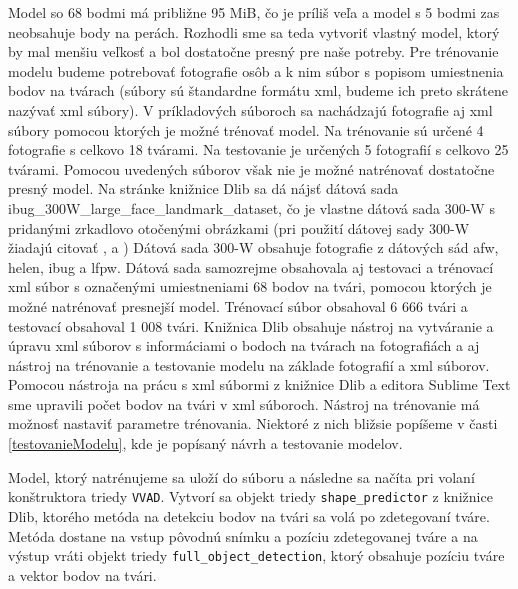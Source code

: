 Model so 68 bodmi má približne 95 MiB, čo je príliš veľa a model s 5 bodmi zas neobsahuje body na perách.
Rozhodli sme sa teda vytvoriť vlastný model, ktorý by mal menšiu veľkosť a bol dostatočne presný pre naše potreby.
Pre trénovanie modelu budeme potrebovať fotografie osôb a k nim súbor s popisom umiestnenia bodov na tvárach (súbory sú štandardne formátu xml, budeme ich preto skrátene nazývať xml súbory).
V príkladových súboroch sa nachádzajú fotografie aj xml súbory pomocou ktorých je možné trénovať model.
Na trénovanie sú určené 4 fotografie s celkovo 18 tvárami.
Na testovanie je určených 5 fotografií s celkovo 25 tvárami.
Pomocou uvedených súborov však nie je možné natrénovať dostatočne presný model.
Na stránke knižnice Dlib sa dá nájsť dátová sada ibug\_300W\_large\_face\_landmark\_dataset, čo je vlastne dátová sada 300-W \cite{ibug} s pridanými zrkadlovo otočenými obrázkami (pri použití dátovej sady  300-W \cite{ibug} žiadajú citovať \cite{sagonas2016300}, \cite{sagonas2013300} a \cite{sagonas2013semi}) 
Dátová sada  300-W \cite{ibug} obsahuje fotografie z dátových sád afw, helen, ibug a lfpw. 
Dátová sada samozrejme obsahovala aj testovaci a trénovací xml súbor s označenými umiestneniami 68 bodov na tvári, pomocou ktorých je možné natrénovať presnejší model.
Trénovací súbor obsahoval 6 666 tvári a testovací obsahoval 1 008 tvári.
Knižnica Dlib obsahuje nástroj na vytváranie a úpravu xml súborov s informáciami o bodoch na tvárach na fotografiách a aj nástroj na trénovanie a testovanie modelu na základe fotografií a xml súborov.
Pomocou nástroja na prácu s xml súbormi z knižnice Dlib a editora Sublime Text sme upravili počet bodov na tvári v xml súboroch.
Nástroj na trénovanie má možnosť nastaviť parametre trénovania.
Niektoré z nich bližsie popíšeme v časti \ref{testovanieModelu}, kde je popísaný návrh a testovanie modelov.

Model, ktorý natrénujeme sa uloží do súboru a následne sa načíta pri volaní konštruktora triedy \texttt{VVAD}.
Vytvorí sa objekt triedy \texttt{shape\_predictor} z knižnice Dlib, ktorého metóda na detekciu bodov na tvári sa volá po zdetegovaní tváre.
Metóda dostane na vstup pôvodnú snímku a pozíciu zdetegovanej tváre a na výstup vráti objekt triedy \texttt{full\_object\_detection}, ktorý obsahuje pozíciu tváre a vektor bodov na tvári.

